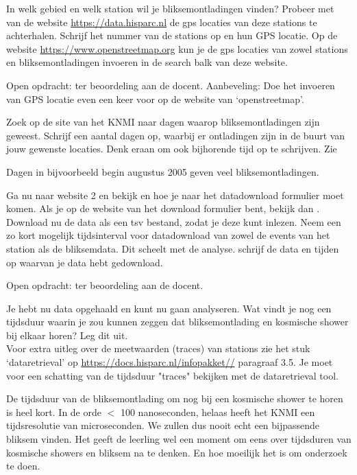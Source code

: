 \begin{questions}
\question
In welk gebied en welk station wil je bliksemontladingen vinden? Probeer met
van de website \url{https://data.hisparc.nl} de gps locaties van deze stations te
achterhalen. Schrijf het nummer van de stations op en hun GPS locatie.
Op de website \url{https://www.openstreetmap.org} kun je de gps locaties van zowel
stations en bliksemontladingen invoeren in de search balk van deze website.
\begin{solution}
    Open opdracht: ter beoordeling aan de docent. Aanbeveling: Doe het invoeren van GPS locatie
    even een keer voor op de website van `openstreetmap'.
\end{solution}

\question
Zoek op de site van het KNMI naar dagen waarop bliksemontladingen zijn geweest.
Schrijf een aantal dagen op, waarbij er ontladingen zijn in de buurt van jouw gewenste
locaties. Denk eraan om ook bijhorende tijd op te schrijven. Zie 
\begin{solution}
    Dagen in bijvoorbeeld begin augustus 2005 geven veel bliksemontladingen.
\end{solution}

\question
Ga nu naar website 2 en bekijk  en 
hoe je naar het datadownload formulier moet komen.
Als je op de website van het download formulier bent, bekijk dan .
Download nu de data als een tsv bestand, zodat je deze kunt inlezen. Neem een zo kort mogelijk tijdsinterval
voor datadownload van zowel de events van het \hisparc station als de bliksemdata.
Dit scheelt met de analyse. schrijf de data en tijden op waarvan je data hebt gedownload.
\begin{solution}
    Open opdracht: ter beoordeling aan de docent.
\end{solution}

\question
Je hebt nu data opgehaald en kunt nu gaan analyseren.
Wat vindt je nog een tijdsduur waarin je zou kunnen zeggen dat bliksemontlading
en kosmische shower bij elkaar horen? Leg dit uit. \\
\small{Voor extra uitleg over de meetwaarden (traces) van \hisparc stations zie het stuk `dataretrieval'
op \url{ https://docs.hisparc.nl/infopakket//} paragraaf 3.5.
Je moet voor een schatting van de tijdsduur "traces" bekijken met de dataretrieval tool.}
\begin{solution}
    De tijdsduur van de bliksemontlading om nog bij een kosmische shower te horen
    is heel kort. In de orde $<$ 100 nanoseconden, helaas heeft het KNMI een tijdsresolutie
    van microseconden. We zullen dus nooit echt een bijpassende bliksem vinden.
    Het geeft de leerling wel een moment om eens over tijdsduren van kosmische showers en bliksem
    na te denken. En hoe moeilijk het is om onderzoek te doen.
\end{solution}


\end{questions}
